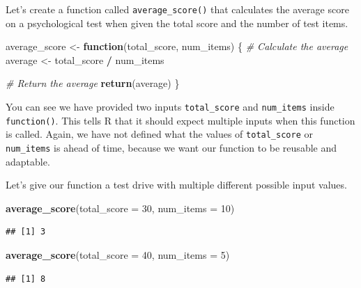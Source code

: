 \documentclass[
]{book}
\newenvironment{Shaded}{\begin{snugshade}}{\end{snugshade}}
\newcommand{\AttributeTok}[1]{\textcolor[rgb]{0.13,0.29,0.53}{#1}}
\newcommand{\CommentTok}[1]{\textcolor[rgb]{0.56,0.35,0.01}{\textit{#1}}}
\newcommand{\ControlFlowTok}[1]{\textcolor[rgb]{0.13,0.29,0.53}{\textbf{#1}}}
\newcommand{\DecValTok}[1]{\textcolor[rgb]{0.00,0.00,0.81}{#1}}
\newcommand{\FunctionTok}[1]{\textcolor[rgb]{0.13,0.29,0.53}{\textbf{#1}}}
\newcommand{\NormalTok}[1]{#1}
\newcommand{\OtherTok}[1]{\textcolor[rgb]{0.56,0.35,0.01}{#1}}
\newcommand{\SpecialCharTok}[1]{\textcolor[rgb]{0.81,0.36,0.00}{\textbf{#1}}}
\begin{document}
Let's create a function called \texttt{average\_score()} that calculates the average score on a psychological test when given the total score and the number of test items.

\begin{Shaded}
\begin{Highlighting}[]
\NormalTok{average\_score }\OtherTok{\textless{}{-}} \ControlFlowTok{function}\NormalTok{(total\_score, num\_items) \{}
  \CommentTok{\# Calculate the average}
\NormalTok{  average }\OtherTok{\textless{}{-}}\NormalTok{ total\_score }\SpecialCharTok{/}\NormalTok{ num\_items}
  
  \CommentTok{\# Return the average}
  \FunctionTok{return}\NormalTok{(average)}
\NormalTok{\}}
\end{Highlighting}
\end{Shaded}

You can see we have provided two inputs \texttt{total\_score} and \texttt{num\_items} inside \texttt{function()}. This tells R that it should expect multiple inputs when this function is called. Again, we have not defined what the values of \texttt{total\_score} or \texttt{num\_items} is ahead of time, because we want our function to be reusable and adaptable.

Let's give our function a test drive with multiple different possible input values.

\begin{Shaded}
\begin{Highlighting}[]
\FunctionTok{average\_score}\NormalTok{(}\AttributeTok{total\_score =} \DecValTok{30}\NormalTok{, }\AttributeTok{num\_items =} \DecValTok{10}\NormalTok{)}
\end{Highlighting}
\end{Shaded}

\begin{verbatim}
## [1] 3
\end{verbatim}

\begin{Shaded}
\begin{Highlighting}[]
\FunctionTok{average\_score}\NormalTok{(}\AttributeTok{total\_score =} \DecValTok{40}\NormalTok{, }\AttributeTok{num\_items =} \DecValTok{5}\NormalTok{)}
\end{Highlighting}
\end{Shaded}

\begin{verbatim}
## [1] 8
\end{verbatim}
\end{document}
